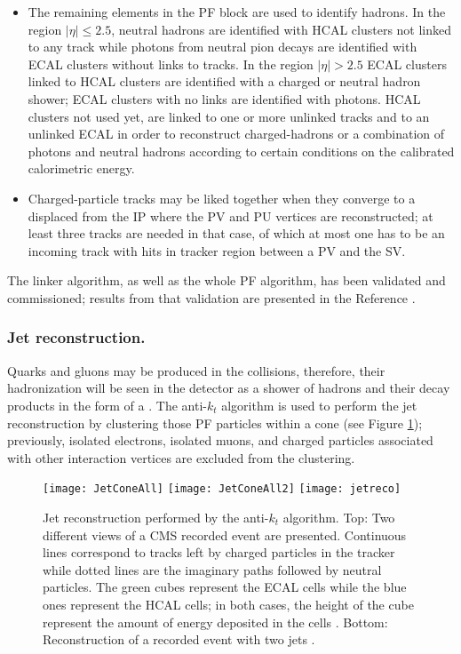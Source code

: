 \begin{itemize}
\item The remaining elements in the PF block are used to identify hadrons. In the region $|\eta| \leq 2.5$, neutral hadrons are identified with HCAL clusters not linked to any track while photons from neutral pion decays are identified with ECAL clusters without links to tracks. In the region $|\eta| >2.5$ ECAL clusters linked to HCAL clusters are identified with a charged or neutral hadron shower; ECAL clusters with no links are identified with photons.
  HCAL clusters not used yet, are linked to one or more unlinked tracks and to an unlinked ECAL in order to reconstruct charged-hadrons or a combination of photons and neutral hadrons according to certain conditions on the calibrated calorimetric energy.         

\item Charged-particle tracks may be liked together when they converge to a  displaced from the IP where the PV and PU vertices are reconstructed; at least three tracks are needed in that case, of which at most one has to be an incoming track with hits in tracker region between a PV and the SV.\\
\end{itemize}

\noindent The linker algorithm, as well as the whole PF algorithm, has been validated and commissioned; results from that validation are presented in the Reference \cite{particle_flow}.

\subsubsection*{Jet reconstruction.}

\noindent Quarks and gluons may be produced in the \pp collisions, therefore, their hadronization will be seen in the detector as a shower of hadrons and their decay products in the form of a . The anti-$k_t$ algorithm \cite{antikt} is used to perform the jet reconstruction by clustering those PF particles within a cone (see Figure \ref{fig:jetcone}); previously, isolated electrons, isolated muons, and charged particles associated with other interaction vertices are excluded from the clustering.  

\begin{figure}[!h]
  \centering
  \texttt{[image: JetConeAll]}
  \texttt{[image: JetConeAll2]}
    \texttt{[image: jetreco]}
  \caption[Jet reconstruction.]{Jet reconstruction performed by the anti-$k_t$ algorithm. Top: Two different views of a CMS recorded event are presented. Continuous lines correspond to tracks left by charged particles in the tracker while dotted lines are the imaginary paths followed by neutral particles. The green cubes represent the ECAL cells while the blue ones represent the HCAL cells; in both cases, the height of the cube represent the amount of energy deposited in the cells \cite{jetconeview}. Bottom: Reconstruction of a recorded event with two jets \cite{jetreco}.}\label{fig:jetcone}
\end{figure}

